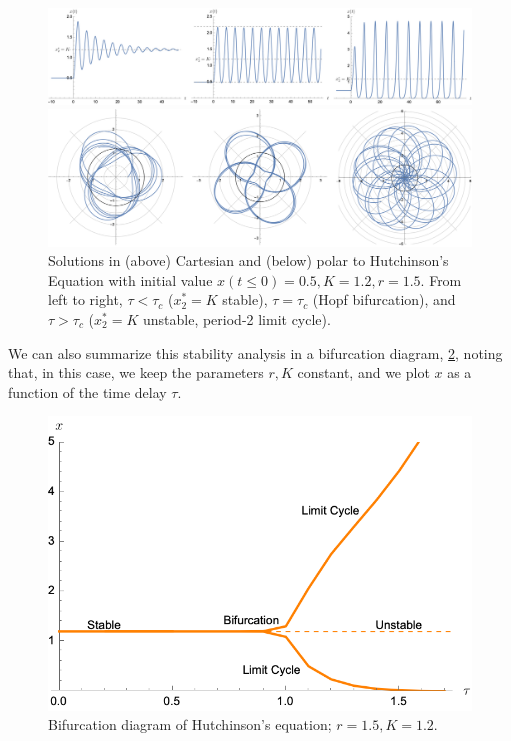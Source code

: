 \documentclass[12pt]{article}
\begin{document}
\begin{figure}[!ht]
    \centering
    \includegraphics*[width=\linewidth]{figures/example2.png}
    \vspace{1.5em}
    \caption{Solutions in (above) Cartesian and (below) polar to Hutchinson's Equation with initial value $x(t \leq 0) = 0.5, K = 1.2, r = 1.5$. From left to right, $\tau < \tau_c$ ($x_2^* = K$ stable), $\tau = \tau_c$ (Hopf bifurcation), and $\tau > \tau_c$ ($x_2^* = K$ unstable, period-2 limit cycle). }
    \label{fig:example2sol}
    \vspace{2em}
    \includegraphics*[width=\linewidth]{figures/example2polar.png}
\end{figure}

We can also summarize this stability analysis in a bifurcation diagram, \cref{fig:bifurcationdiagramex2}, noting that, in this case, we keep the parameters $r, K$ constant, and we plot $x$ as a function of the time delay $\tau$.

\begin{figure}[!ht]
    \centering
    \includegraphics*[width=0.5\linewidth]{figures/bifurcationdiagramexample2.png}
    \caption{Bifurcation diagram of Hutchinson's equation; $r = 1.5, K = 1.2$.}
    \label{fig:bifurcationdiagramex2}
\end{figure}
\end{document}
